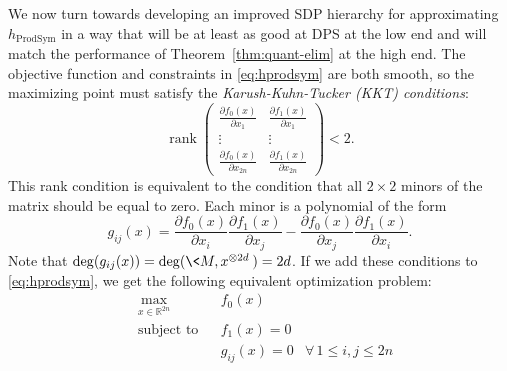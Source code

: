 \documentclass[aps,pra,notitlepage,preprintnumbers,11pt,tightenlines]{revtex4-1}
\newcommand{\RR}{\mathbb{R}}
\newcommand{\pd}{\partial}
\newcommand{\ot}{\otimes}
\newcommand{\be}{\begin{equation}}
\newcommand{\ee}{\end{equation}}
\DeclareMathOperator{\ProdSym}{ProdSym}
\DeclareMathOperator{\rank}{rank}
\newcommand{\thmref}[1]{Theorem~\ref{thm:#1}}
\begin{document}
We now turn towards developing an improved SDP hierarchy for approximating
$h_{\ProdSym}$ in a way that will be at least as good at DPS at the
low end and will match the performance of \thmref{quant-elim} at the
high end.
The objective function and constraints in \eqref{eq:hprodsym} are both smooth, so the
maximizing point must satisfy the \emph{Karush-Kuhn-Tucker
  (KKT) conditions}:
\[ \rank \begin{pmatrix} \frac{\pd f_0(x)}{\pd x_1} & \frac{\pd
    f_1(x)}{\pd x_1} \\ \vdots & \vdots \\ \frac{\pd f_0(x)}{\pd x_{2n}}
  & \frac{\pd f_1(x)}{\pd x_{2n}} \end{pmatrix} < 2. \]
This rank condition is equivalent to the condition that all $2\times
2$ minors of the matrix should be equal to zero. Each minor is a
polynomial of the form
\be g_{ij}(x) = \frac{\pd f_0(x)}{\pd x_i} \frac{\pd f_1(x)}{\pd x_j} -
\frac{\pd f_0(x)}{\pd x_j} \frac{\pd f_1(x)}{\pd x_i}.
\label{eq:gij-def} \ee
Note that $\deg(g_{ij}(x)) = \deg(\<M, x^{\ot 2d}\>) = 2d$. If we add these conditions to \eqref{eq:hprodsym}, we get the
following equivalent optimization problem:
\begin{equation}
  \label{eq:hsep_kkt}
  \begin{aligned}
    &\max_{x \in \RR^{2n}} & & f_0(x) \\
    &\text{subject to} & & f_1(x) =0\\
    &&& g_{ij}(x) = 0 &  \forall \, 1 \leq i, j \leq 2n
  \end{aligned}
\end{equation}
\end{document}
